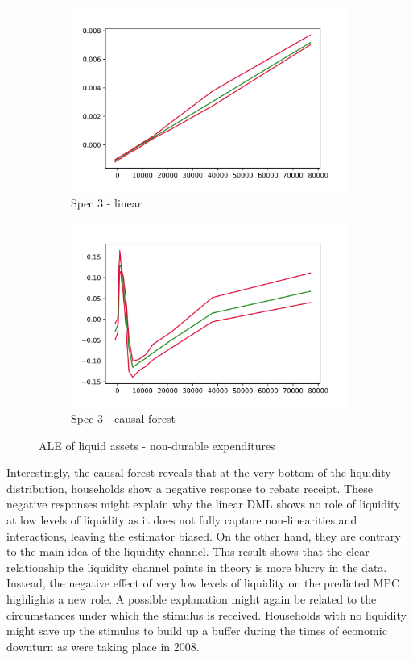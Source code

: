 \begin{figure}[t]
    \centering
    \begin{subfigure}{0.5\textwidth}
        \includegraphics[width=\textwidth]{figures/ALE/chNDexp/spec3_linear_liqassii.png}
        \caption{Spec 3 - linear}
    \end{subfigure}%
    \begin{subfigure}{0.5\textwidth}
        \includegraphics[width=\textwidth]{figures/ALE/chNDexp/spec3_cf_liqassii.png}
        \caption{Spec 3 - causal forest}
    \end{subfigure}
    \caption{ALE of liquid assets - non-durable expenditures}
    \label{fig:ale_liquid}
\end{figure}
Interestingly, the causal forest reveals that at the very bottom of the liquidity distribution, households show a negative response to rebate receipt. These negative responses might explain why the linear DML shows no role of liquidity at low levels of liquidity as it does not fully capture non-linearities and interactions, leaving the estimator biased. On the other hand, they are contrary to the main idea of the liquidity channel. This result shows that the clear relationship the liquidity channel paints in theory is more blurry in the data. Instead, the negative effect of very low levels of liquidity on the predicted MPC highlights a new role. A possible explanation might again be related to the circumstances under which the stimulus is received. Households with no liquidity might save up the stimulus to build up a buffer during the times of economic downturn as were taking place in 2008. \\
